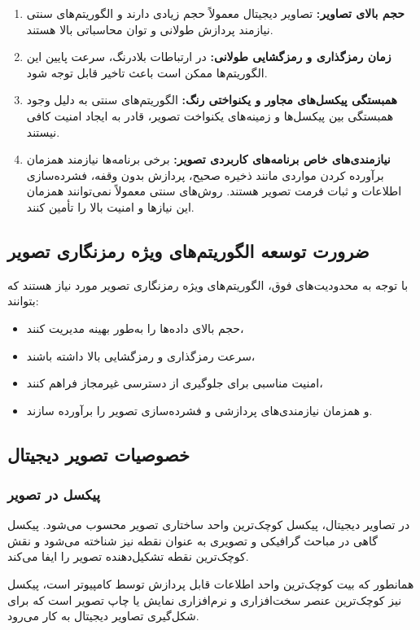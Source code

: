 \begin{enumerate}
    \item \textbf{حجم بالای تصاویر:} تصاویر دیجیتال معمولاً حجم زیادی دارند و الگوریتم‌های سنتی نیازمند پردازش طولانی و توان محاسباتی بالا هستند.
    \item \textbf{زمان رمزگذاری و رمزگشایی طولانی:} در ارتباطات بلادرنگ، سرعت پایین این الگوریتم‌ها ممکن است باعث تاخیر قابل توجه شود.
    \item \textbf{همبستگی پیکسل‌های مجاور و یکنواختی رنگ:} الگوریتم‌های سنتی به دلیل وجود همبستگی بین پیکسل‌ها و زمینه‌های یکنواخت تصویر، قادر به ایجاد امنیت کافی نیستند.
    \item \textbf{نیازمندی‌های خاص برنامه‌های کاربردی تصویر:} برخی برنامه‌ها نیازمند همزمان برآورده کردن مواردی مانند ذخیره صحیح، پردازش بدون وقفه، فشرده‌سازی اطلاعات و ثبات فرمت تصویر هستند. روش‌های سنتی معمولاً نمی‌توانند همزمان این نیازها و امنیت بالا را تأمین کنند.
\end{enumerate}

\subsection{ضرورت توسعه الگوریتم‌های ویژه رمزنگاری تصویر}
با توجه به محدودیت‌های فوق، الگوریتم‌های ویژه رمزنگاری تصویر مورد نیاز هستند که بتوانند:
\begin{itemize}
    \item حجم بالای داده‌ها را به‌طور بهینه مدیریت کنند،
    \item سرعت رمزگذاری و رمزگشایی بالا داشته باشند،
    \item امنیت مناسبی برای جلوگیری از دسترسی غیرمجاز فراهم کنند،
    \item و همزمان نیازمندی‌های پردازشی و فشرده‌سازی تصویر را برآورده سازند\cite{ref45}.
\end{itemize}

\subsection{خصوصیات تصویر دیجیتال}
\subsubsection{پیکسل در تصویر}
در تصاویر دیجیتال، پیکسل کوچک‌ترین واحد ساختاری تصویر محسوب می‌شود\cite{ref46}. پیکسل گاهی در مباحث گرافیکی و تصویری به عنوان نقطه نیز شناخته می‌شود و نقش کوچک‌ترین نقطه تشکیل‌دهنده تصویر را ایفا می‌کند.

همانطور که بیت کوچک‌ترین واحد اطلاعات قابل پردازش توسط کامپیوتر است، پیکسل نیز کوچک‌ترین عنصر سخت‌افزاری و نرم‌افزاری نمایش یا چاپ تصویر است که برای شکل‌گیری تصاویر دیجیتال به کار می‌رود.

